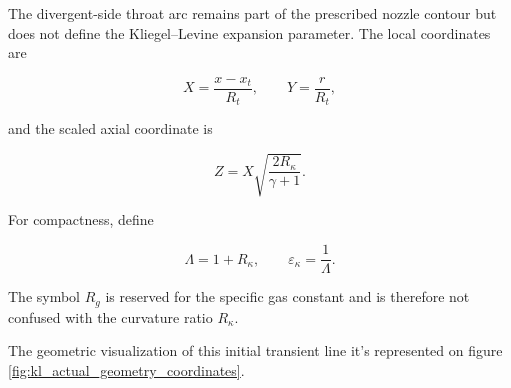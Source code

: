 The divergent-side throat arc remains part of the prescribed nozzle contour
but does not define the Kliegel--Levine expansion parameter.  The local
coordinates are

\begin{equation}
    X=\frac{x-x_t}{R_t},
    \qquad
    Y=\frac{r}{R_t},
\end{equation}

and the scaled axial coordinate is

\begin{equation}
    \boxed{
    Z=X\sqrt{\frac{2R_\kappa}{\gamma+1}}
    }.
\end{equation}

For compactness, define

\begin{equation}
    \Lambda=1+R_\kappa,
    \qquad
    \varepsilon_\kappa=\frac{1}{\Lambda}.
\end{equation}

The symbol \(R_g\) is reserved for the specific gas constant and is therefore
not confused with the curvature ratio \(R_\kappa\).

The geometric visualization of this initial transient line it's represented on figure \ref{fig:kl_actual_geometry_coordinates}.

